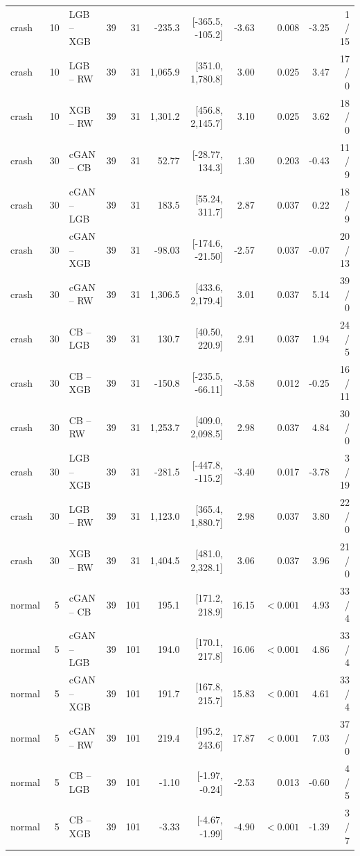 \documentclass[11pt,a4paper]{article}
\begin{document}
{\begin{longtable}{lrlrrrrrrrr}
crash & 10 & LGB -- XGB & 39 & 31 & -235.3 & [-365.5, -105.2] & -3.63 & 0.008 & -3.25 & 1 / 15 \\
crash & 10 & LGB -- RW & 39 & 31 & 1,065.9 & [351.0, 1,780.8] & 3.00 & 0.025 & 3.47 & 17 / 0 \\
crash & 10 & XGB -- RW & 39 & 31 & 1,301.2 & [456.8, 2,145.7] & 3.10 & 0.025 & 3.62 & 18 / 0 \\
\addlinespace
crash & 30 & cGAN -- CB & 39 & 31 & 52.77 & [-28.77, 134.3] & 1.30 & 0.203 & -0.43 & 11 / 9 \\
crash & 30 & cGAN -- LGB & 39 & 31 & 183.5 & [55.24, 311.7] & 2.87 & 0.037 & 0.22 & 18 / 9 \\
crash & 30 & cGAN -- XGB & 39 & 31 & -98.03 & [-174.6, -21.50] & -2.57 & 0.037 & -0.07 & 20 / 13 \\
crash & 30 & cGAN -- RW & 39 & 31 & 1,306.5 & [433.6, 2,179.4] & 3.01 & 0.037 & 5.14 & 39 / 0 \\
crash & 30 & CB -- LGB & 39 & 31 & 130.7 & [40.50, 220.9] & 2.91 & 0.037 & 1.94 & 24 / 5 \\
crash & 30 & CB -- XGB & 39 & 31 & -150.8 & [-235.5, -66.11] & -3.58 & 0.012 & -0.25 & 16 / 11 \\
crash & 30 & CB -- RW & 39 & 31 & 1,253.7 & [409.0, 2,098.5] & 2.98 & 0.037 & 4.84 & 30 / 0 \\
crash & 30 & LGB -- XGB & 39 & 31 & -281.5 & [-447.8, -115.2] & -3.40 & 0.017 & -3.78 & 3 / 19 \\
crash & 30 & LGB -- RW & 39 & 31 & 1,123.0 & [365.4, 1,880.7] & 2.98 & 0.037 & 3.80 & 22 / 0 \\
crash & 30 & XGB -- RW & 39 & 31 & 1,404.5 & [481.0, 2,328.1] & 3.06 & 0.037 & 3.96 & 21 / 0 \\
\addlinespace
normal & 5 & cGAN -- CB & 39 & 101 & 195.1 & [171.2, 218.9] & 16.15 & $<0.001$ & 4.93 & 33 / 4 \\
normal & 5 & cGAN -- LGB & 39 & 101 & 194.0 & [170.1, 217.8] & 16.06 & $<0.001$ & 4.86 & 33 / 4 \\
normal & 5 & cGAN -- XGB & 39 & 101 & 191.7 & [167.8, 215.7] & 15.83 & $<0.001$ & 4.61 & 33 / 4 \\
normal & 5 & cGAN -- RW & 39 & 101 & 219.4 & [195.2, 243.6] & 17.87 & $<0.001$ & 7.03 & 37 / 0 \\
normal & 5 & CB -- LGB & 39 & 101 & -1.10 & [-1.97, -0.24] & -2.53 & 0.013 & -0.60 & 4 / 5 \\
normal & 5 & CB -- XGB & 39 & 101 & -3.33 & [-4.67, -1.99] & -4.90 & $<0.001$ & -1.39 & 3 / 7 \\

\end{longtable}}
\end{document}
